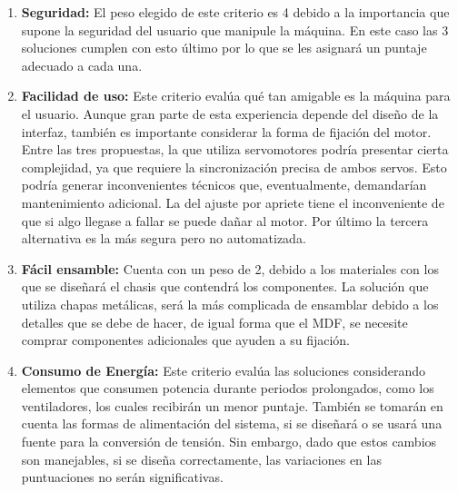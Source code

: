\begin{enumerate}
    \item \textbf{Seguridad:} El peso elegido de este criterio es 4 debido a la importancia que supone la seguridad del usuario que manipule la máquina. En este caso las 3 soluciones cumplen con esto último por lo que se les asignará un puntaje adecuado a cada una. 
    
    \item \textbf{Facilidad de uso:} Este criterio evalúa qué tan amigable es la máquina para el usuario. Aunque gran parte de esta experiencia depende del diseño de la interfaz, también es importante considerar la forma de fijación del motor. Entre las tres propuestas, la que utiliza servomotores podría presentar cierta complejidad, ya que requiere la sincronización precisa de ambos servos. Esto podría generar inconvenientes técnicos que, eventualmente, demandarían mantenimiento adicional. La del ajuste por apriete tiene el inconveniente de que si algo llegase a fallar se puede dañar al motor. Por último la tercera alternativa es la más segura pero no automatizada.
    
    \item \textbf{Fácil ensamble:} Cuenta con un peso de 2, debido a los materiales con los que se diseñará el chasis que contendrá los componentes. La solución que utiliza chapas metálicas, será la más complicada de ensamblar debido a los detalles que se debe de hacer, de igual forma que el MDF, se necesite comprar componentes adicionales que ayuden a su fijación. 
    
    \item \textbf{Consumo de Energía:} Este criterio evalúa las soluciones considerando elementos que consumen potencia durante periodos prolongados, como los ventiladores, los cuales recibirán un menor puntaje. También se tomarán en cuenta las formas de alimentación del sistema, si se diseñará o se usará una fuente para la conversión de tensión. Sin embargo, dado que estos cambios son manejables, si se diseña correctamente, las variaciones en las puntuaciones no serán significativas.

    
\end{enumerate}


